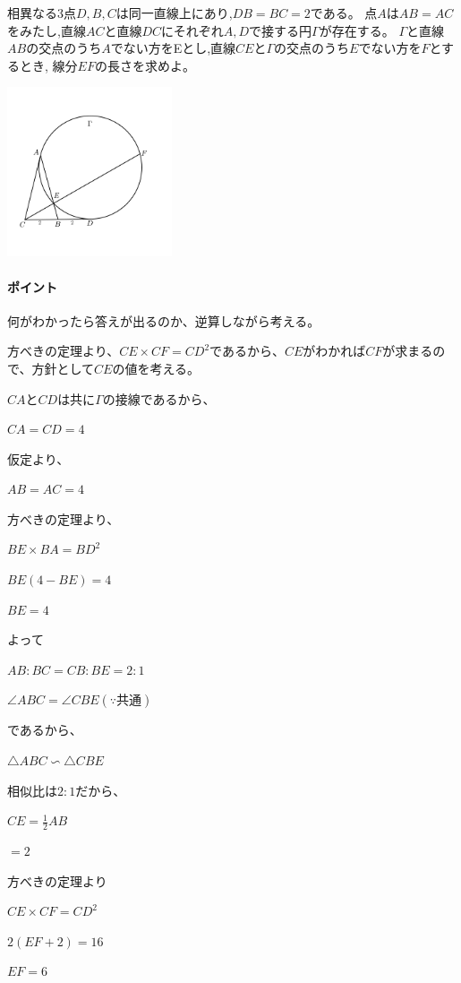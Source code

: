 \documentclass[uplatex,dvipdfmx]{jsbook}
\begin{document}
\begin{problem}[練習問題1]
    相異なる3点$D,B,C$は同一直線上にあり,$DB=BC=2$である。
    点$A$は$AB=AC$をみたし,直線$AC$と直線$DC$にそれぞれ$A,D$で接する円$\Gamma$が存在する。
    $\Gamma$と直線$AB$の交点のうち$A$でない方をEとし,直線$CE$と$\Gamma$の交点のうち$E$でない方を$F$とするとき,
    線分$EF$の長さを求めよ。

    \includegraphics[clip,height=5cm]{figures/practice1.pdf}

\end{problem}

\paragraph{ポイント} 何がわかったら答えが出るのか、逆算しながら考える。

\begin{answer}
    方べきの定理より、$CE\times CF=CD^2$であるから、$CE$がわかれば$CF$が求まるので、方針として$CE$の値を考える。

    $CA$と$CD$は共に$\Gamma$の接線であるから、

    $CA=CD=4$

    仮定より、

    $AB=AC=4$

    方べきの定理より、

    $BE\times BA=BD^2$

    $BE(4-BE)=4$

    $BE=4$

    よって

    $AB:BC=CB:BE=2:1$

    $\angle ABC = \angle CBE(\because 共通)$

    であるから、

    $\triangle ABC ∽ \triangle CBE$

    相似比は$2:1$だから、

    $\displaystyle CE=\frac{1}{2}AB$

    $=2$

    方べきの定理より

    $CE\times CF = CD^2$

    $2(EF+2)=16$

    $EF=6$
\end{answer}
\end{document}
